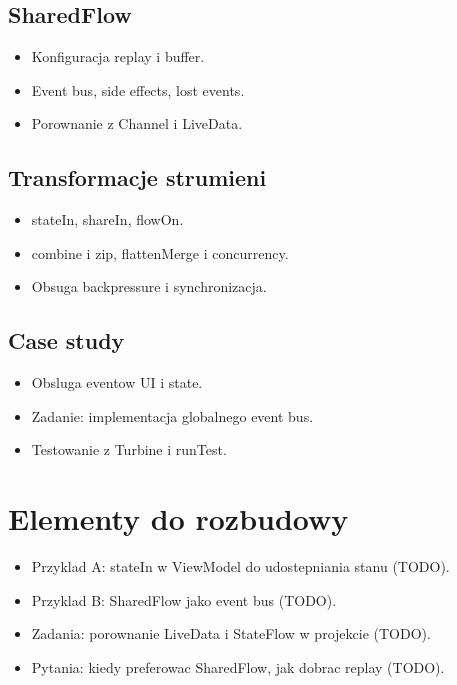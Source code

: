 \subsection{SharedFlow}
\begin{itemize}
  \item Konfiguracja replay i buffer.
  \item Event bus, side effects, lost events.
  \item Porownanie z Channel i LiveData.
\end{itemize}

\subsection{Transformacje strumieni}
\begin{itemize}
  \item stateIn, shareIn, flowOn.
  \item combine i zip, flattenMerge i concurrency.
  \item Obsuga backpressure i synchronizacja.
\end{itemize}

\subsection{Case study}
\begin{itemize}
  \item Obsluga eventow UI i state.
  \item Zadanie: implementacja globalnego event bus.
  \item Testowanie z Turbine i runTest.
\end{itemize}

\section{Elementy do rozbudowy}
\begin{itemize}
  \item Przyklad A: stateIn w ViewModel do udostepniania stanu (TODO).
  \item Przyklad B: SharedFlow jako event bus (TODO).
  \item Zadania: porownanie LiveData i StateFlow w projekcie (TODO).
  \item Pytania: kiedy preferowac SharedFlow, jak dobrac replay (TODO).
\end{itemize}

